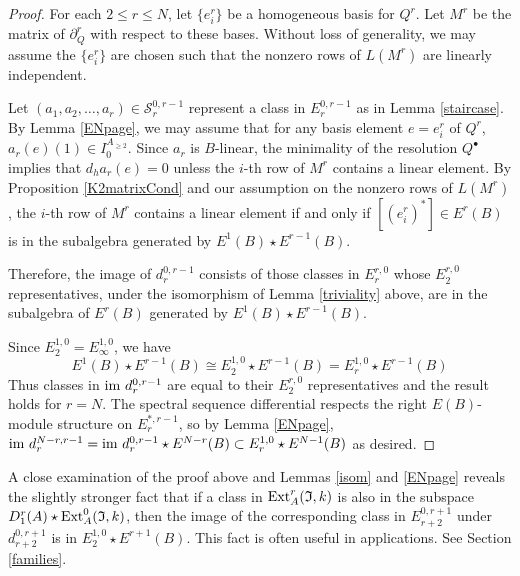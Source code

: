 \documentclass[11pt,righttag]{amsart}
\begin{document}
  \begin{proof}
 
 
 For each $2\le r\le N$, let $\{e_i^r\}$ be a homogeneous basis for $Q^r$. Let $M^r$ be the matrix of $\partial_Q^r$ with respect to these bases. Without loss of generality, we may assume the $\{e_i^r\}$ are chosen such that the nonzero rows of $L(M^r)$ are linearly independent.

Let $(a_1, a_2,\ldots, a_r)\in {\mathcal S}_r^{0,r-1}$ represent a class in $E_r^{0,r-1}$ as in Lemma \ref{staircase}. 
By  Lemma \ref{ENpage}, we may assume that for any basis element $e=e^r_i$ of $Q^r$, $a_r(e)(1)\in I_0^{A_{\ge 2}}$. Since $a_r$ is $B$-linear, the minimality of the resolution $Q^{\bullet}$  implies that $d_ha_r(e)=0$ unless the $i$-th row of $M^r$ contains a linear element. 
By Proposition \ref{K2matrixCond} and our assumption on the nonzero rows of $L(M^r)$, the $i$-th row of $M^r$ contains a linear element if and only if $[(e_i^r)^*]\in E^r(B)$ is in the subalgebra generated by $E^1(B)\star E^{r-1}(B)$. 

Therefore, the image of $d_r^{0,r-1}$ consists of those classes in $E_r^{r,0}$ whose $E_2^{r,0}$ representatives, under the isomorphism of Lemma \ref{triviality} above, are in the subalgebra of $E^r(B)$ generated by $E^1(B)\star E^{r-1}(B)$. 

Since $E_2^{1,0}=E_{\infty}^{1,0}$, we have $$E^1(B)\star E^{r-1}(B){\cong} E_2^{1,0}\star E^{r-1}(B)=E_r^{1,0}\star E^{r-1}(B)$$ Thus classes in ${\hbox{im}}\ d_r^{0,r-1}$ are equal to their $E_2^{r,0}$ representatives and the result holds for $r=N$.
The spectral sequence differential respects the right $E(B)$-module structure on $E_r^{*,r-1}$, so by Lemma \ref{ENpage}, ${\hbox{im}}\ d_r^{N-r,r-1}={\hbox{im}}\ d_r^{0,r-1}\star E^{N-r}(B)\subset E_r^{1,0}\star E^{N-1}(B)$ as desired.

  \end{proof}
  
 \begin{rmk}
 \label{survivesRmk}
 A close examination of the proof above and Lemmas \ref{isom} and \ref{ENpage} reveals the slightly stronger fact that if a class in ${\hbox{{\rm Ext}}}_A^r({\mathfrak{I}},k)$ is also in the subspace $D_1^{r}(A)\star{\hbox{{\rm Ext}}}^0_A({\mathfrak{I}},k)$, then the image of the corresponding class in $E_{r+2}^{0,r+1}$ under $d_{r+2}^{0,r+1}$ is in $E_2^{1,0}\star E^{r+1}(B)$. This fact is often useful in applications. See Section \ref{families}.
 \end{rmk}
\end{document}
